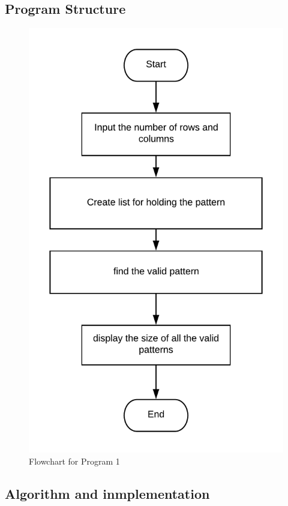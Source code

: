\documentclass[12pt]{article}
\begin{document}
\subsection{Program Structure}
\begin{figure}[h]
\begin{center}
\includegraphics[scale=1.05]{ps1_fc.png}
\caption{Flowchart for Program 1}
\end{center}
\end{figure}

\newpage
\subsection{Algorithm and inmplementation}
\end{document}
